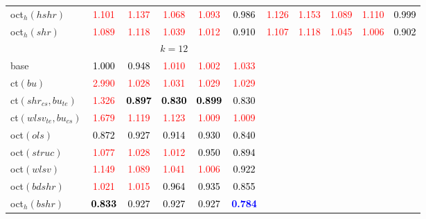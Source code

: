 \begin{tabular}[t]{l|>{}cccc>{}c|ccccc}
oct$_h(hshr)$ & \textcolor{red}{1.101} & \textcolor{red}{1.137} & \textcolor{red}{1.068} & \textcolor{red}{1.093} & \textcolor{black}{0.986} & \textcolor{red}{1.126} & \textcolor{red}{1.153} & \textcolor{red}{1.089} & \textcolor{red}{1.110} & \textcolor{black}{0.999}\\
oct$_h(shr)$ & \textcolor{red}{1.089} & \textcolor{red}{1.118} & \textcolor{red}{1.039} & \textcolor{red}{1.012} & \textcolor{black}{0.910} & \textcolor{red}{1.107} & \textcolor{red}{1.118} & \textcolor{red}{1.045} & \textcolor{red}{1.006} & \textcolor{black}{0.902}\\
\addlinespace[0.3em]
\multicolumn{1}{c}{} & \multicolumn{5}{c}{\textbf{$k = 12$}} & \multicolumn{5}{c}{}\\
base & \textcolor{black}{1.000} & \textcolor{black}{0.948} & \textcolor{red}{1.010} & \textcolor{red}{1.002} & \textcolor{red}{1.033} &  &  &  &  & \\
ct$(bu)$ & \textcolor{red}{2.990} & \textcolor{red}{1.028} & \textcolor{red}{1.031} & \textcolor{red}{1.029} & \textcolor{red}{1.029} &  &  &  &  & \\
ct$(shr_{cs}, bu_{te})$ & \textcolor{red}{1.326} & \textcolor{black}{\textbf{0.897}} & \textcolor{black}{\textbf{0.830}} & \textcolor{black}{\textbf{0.899}} & \textcolor{black}{0.830} &  &  &  &  & \\
ct$(wlsv_{te}, bu_{cs})$ & \textcolor{red}{1.679} & \textcolor{red}{1.119} & \textcolor{red}{1.123} & \textcolor{red}{1.009} & \textcolor{red}{1.009} &  &  &  &  & \\
oct$(ols)$ & \textcolor{black}{0.872} & \textcolor{black}{0.927} & \textcolor{black}{0.914} & \textcolor{black}{0.930} & \textcolor{black}{0.840} &  &  &  &  & \\
oct$(struc)$ & \textcolor{red}{1.077} & \textcolor{red}{1.028} & \textcolor{red}{1.012} & \textcolor{black}{0.950} & \textcolor{black}{0.894} &  &  &  &  & \\
oct$(wlsv)$ & \textcolor{red}{1.149} & \textcolor{red}{1.089} & \textcolor{red}{1.041} & \textcolor{red}{1.006} & \textcolor{black}{0.922} &  &  &  &  & \\
oct$(bdshr)$ & \textcolor{red}{1.021} & \textcolor{red}{1.015} & \textcolor{black}{0.964} & \textcolor{black}{0.935} & \textcolor{black}{0.855} &  &  &  &  & \\
oct$_h(bshr)$ & \textcolor{black}{\textbf{0.833}} & \textcolor{black}{0.927} & \textcolor{black}{0.927} & \textcolor{black}{0.927} & \textcolor{blue}{\textbf{0.784}} &  &  &  &  & \\

\end{tabular}
